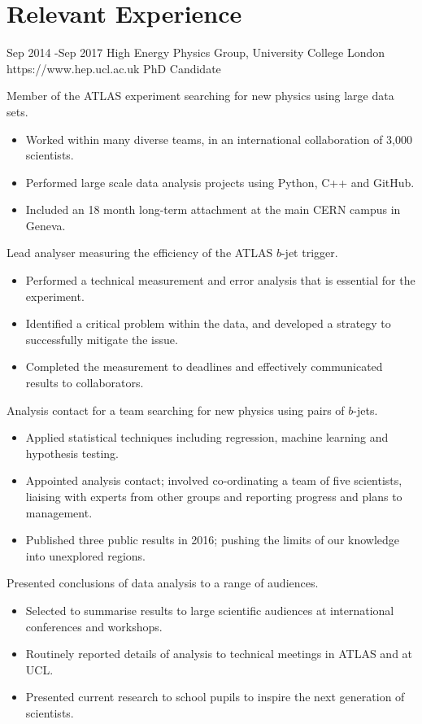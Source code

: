 \documentclass[10pt]{article} %
\begin{document}
\section{Relevant Experience}
\job
{Sep 2014 -}{Sep 2017}
{High Energy Physics Group, University College London}
{https://www.hep.ucl.ac.uk}
{PhD Candidate}
{
  \begin{itemize-noindent}
  \item{Member of the ATLAS experiment searching for new physics using large data sets.}
    \begin{itemize}
    \item{Worked within many diverse teams, in an international collaboration of 3,000 scientists.}
    \item{Performed large scale data analysis projects using Python, C++ and GitHub.}
    \item{Included an 18 month long-term attachment at the main CERN campus in Geneva.} 
    \end{itemize}
  \item{Lead analyser measuring the efficiency of the ATLAS $b$-jet trigger.}
    \begin{itemize}
    \item{Performed a technical measurement and error analysis that is essential for the experiment.}
    \item{Identified a critical problem within the data, and developed a strategy to successfully mitigate the issue.}
    \item{Completed the measurement to deadlines and effectively communicated results to collaborators.}
    \end{itemize}
  \item{Analysis contact for a team searching for new physics using pairs of $b$-jets.}
    \begin{itemize}
    \item{Applied statistical techniques including regression, machine learning and hypothesis testing.}
    \item{Appointed analysis contact; involved co-ordinating a team of five scientists,
      liaising with experts from other groups and reporting progress and plans to management.}
    \item{Published three public results in 2016; pushing the limits of our knowledge into unexplored regions.}
    \end{itemize}
 \item{Presented conclusions of data analysis to a range of audiences.}
   \begin{itemize}
   \item{Selected to summarise results to large scientific audiences at international conferences and workshops.}
   \item{Routinely reported details of analysis to technical meetings in ATLAS and at UCL.}
   \item{Presented current research to school pupils to inspire the next generation of scientists.}
   \end{itemize}
 \end{itemize-noindent}
}
\end{document}

